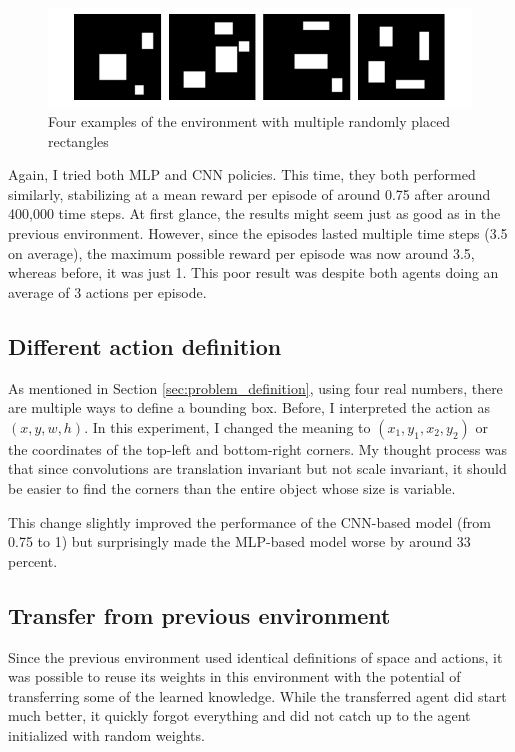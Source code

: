 \documentclass[
  digital,     %
  oneside,     %
  nosansbold,  %
  nocolorbold, %
  lof,         %
  lot,         %
]{fithesis4}
\begin{document}
\begin{figure}
    \includegraphics[width=1\linewidth]{env_examples/env3.pdf}
    \caption{Four examples of the environment with multiple randomly placed rectangles}
    \label{fig:env3}
\end{figure}

Again, I tried both MLP and CNN policies. This time, they both performed similarly, stabilizing at a mean reward per episode of around 0.75 after around 400,000 time steps. At first glance, the results might seem just as good as in the previous environment. However, since the episodes lasted multiple time steps (3.5 on average), the maximum possible reward per episode was now around 3.5, whereas before, it was just 1. This poor result was despite both agents doing an average of 3 actions per episode.

\subsection{Different action definition}
\label{subsec:different_rect_repr}

As mentioned in Section \ref{sec:problem_definition}, using four real numbers, there are multiple ways to define a bounding box. Before, I interpreted the action as $(x, y, w, h)$. In this experiment, I changed the meaning to $(x_1, y_1, x_2, y_2)$ or the coordinates of the top-left and bottom-right corners. My thought process was that since convolutions are translation invariant but not scale invariant, it should be easier to find the corners than the entire object whose size is variable.

This change slightly improved the performance of the CNN-based model (from 0.75 to 1) but surprisingly made the MLP-based model worse by around 33 percent.

\subsection{Transfer from previous environment}

Since the previous environment used identical definitions of space and actions, it was possible to reuse its weights in this environment with the potential of transferring some of the learned knowledge. While the transferred agent did start much better, it quickly forgot everything and did not catch up to the agent initialized with random weights.
\end{document}
